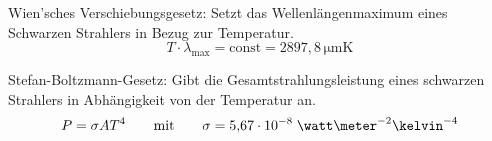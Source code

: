 \documentclass[a4paper,german,12pt,smallheadings]{scrartcl}
\begin{document}
Wien'sches Verschiebungsgesetz: Setzt das Wellenlängenmaximum eines Schwarzen Strahlers in Bezug zur Temperatur.
\begin{equation}
  T \cdot \lambda_\mathrm{max} = \mathrm{const} = 2897{,}8 \, \mathrm{\mu m \mathrm{K}}
\end{equation}

Stefan-Boltzmann-Gesetz: Gibt die Gesamtstrahlungsleistung eines schwarzen Strahlers in Abhängigkeit von der Temperatur an.
\begin{equation}
  P = \sigma A T^4 \qquad \text{mit} \qquad \sigma = 5{,}67 \cdot 10^{-8} \;\watt\meter^{-2}\kelvin^{-4}
\end{equation}
\end{document}
